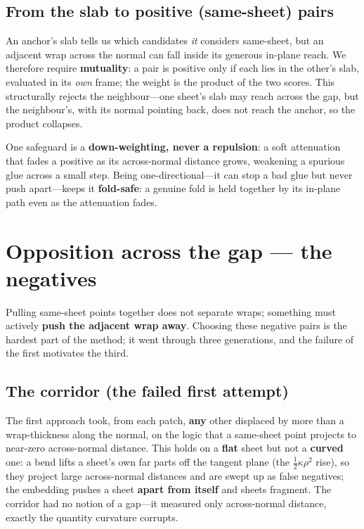\documentclass[10pt,twocolumn,a4paper]{article}
\begin{document}
\subsection{From the slab to positive (same-sheet) pairs}
An anchor's slab tells us which candidates \emph{it} considers same-sheet, but an
adjacent wrap across the normal can fall inside its generous in-plane reach. We
therefore require \textbf{mutuality}: a pair is positive only if each lies in the
other's slab, evaluated in its \emph{own} frame; the weight is the product of the
two scores. This structurally rejects the neighbour---one sheet's slab may reach
across the gap, but the neighbour's, with its normal pointing back, does not reach
the anchor, so the product collapses.

One safeguard is a \textbf{down-weighting, never a repulsion}: a soft attenuation
that fades a positive as its across-normal distance grows, weakening a spurious
glue across a small step. Being one-directional---it can stop a bad glue but never
push apart---keeps it \textbf{fold-safe}: a genuine fold is held together by its
in-plane path even as the attenuation fades.

\section{Opposition across the gap --- the negatives}\label{sec:negatives}
Pulling same-sheet points together does not separate wraps; something must
actively \textbf{push the adjacent wrap away}. Choosing these negative pairs is
the hardest part of the method; it went through three generations, and the
failure of the first motivates the third.

\subsection{The corridor (the failed first attempt)}
The first approach took, from each patch, \textbf{any} other displaced by more
than a wrap-thickness along the normal, on the logic that a same-sheet point
projects to near-zero across-normal distance. This holds on a \textbf{flat} sheet
but not a \textbf{curved} one: a bend lifts a sheet's own far parts off the
tangent plane (the $\tfrac12\kappa\rho^2$ rise), so they project large
across-normal distances and are swept up as false negatives; the embedding pushes
a sheet \textbf{apart from itself} and sheets fragment. The corridor had no notion
of a gap---it measured only across-normal distance, exactly the quantity
curvature corrupts.
\end{document}
